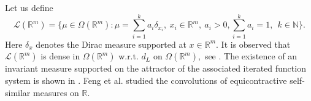 \documentclass{amsproc}
\theoremstyle{definition}
\theoremstyle{remark}
\newtheorem{remark}[theorem]{Remark}
\numberwithin{equation}{section}
\begin{document}
Let us define
\[
\mathcal{L}(\mathbb{R}^m)=\Big\{\mu 
\in \Omega(\mathbb{R}^m): \mu= \sum_{i=1}^k a_i \delta_{x_i},~x_i \in \mathbb{R}^m, ~a_i > 0, \sum_{i=1}^k a_i=1,~~ k \in \mathbb{N} \Big\}.
\]
Here $\delta_x$ denotes the Dirac measure supported at $x \in \mathbb{R}^m.$ It is observed that $\mathcal{L}(\mathbb{R}^m)$ is dense in $\Omega(\mathbb{R}^m)$ w.r.t. $d_L$ on $\Omega(\mathbb{R}^m),$ see \cite{Bill}. The existence of an invariant measure supported on the attractor of the associated iterated function system is shown in \cite{H}. Feng et al. \cite{Feng} studied the convolutions of equicontractive self-similar measures on $\mathbb{R}.$ 
\end{document}
